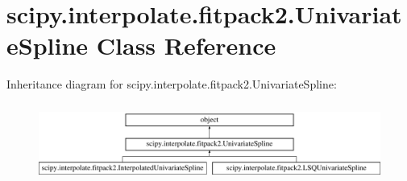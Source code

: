 \hypertarget{classscipy_1_1interpolate_1_1fitpack2_1_1UnivariateSpline}{}\section{scipy.\+interpolate.\+fitpack2.\+Univariate\+Spline Class Reference}
\label{classscipy_1_1interpolate_1_1fitpack2_1_1UnivariateSpline}
Inheritance diagram for scipy.\+interpolate.\+fitpack2.\+Univariate\+Spline\+:\begin{figure}[H]
\begin{center}
\leavevmode
\includegraphics[height=2.600619cm]{classscipy_1_1interpolate_1_1fitpack2_1_1UnivariateSpline}
\end{center}
\end{figure}
